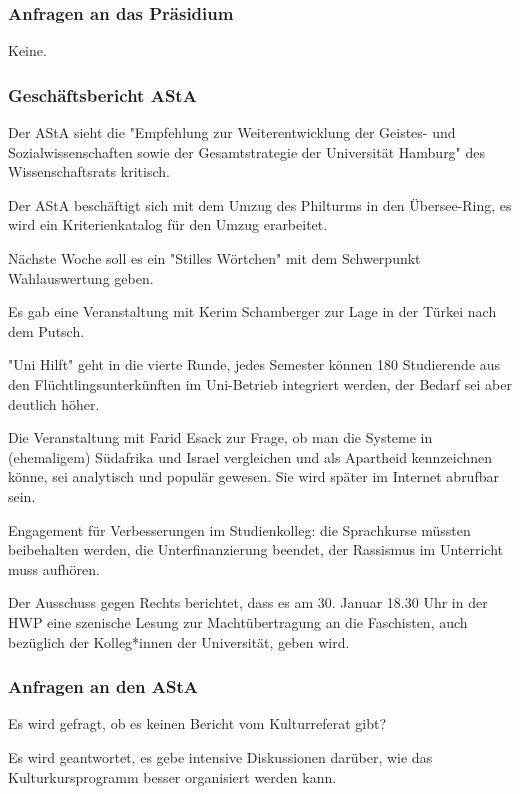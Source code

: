 \documentclass[ngerman,headheight=70pt]{scrartcl}
\begin{document}
    \subsubsection{Anfragen an das Präsidium}

    Keine.

    \subsubsection{Geschäftsbericht AStA}

    Der AStA sieht die "Empfehlung zur Weiterentwicklung der Geistes- und
    Sozialwissenschaften sowie der Gesamtstrategie der Universität Hamburg" des
    Wissenschaftsrats kritisch.

    Der AStA beschäftigt sich mit dem Umzug des Philturms in den Übersee-Ring,
    es wird ein Kriterienkatalog für den Umzug erarbeitet.

    Nächste Woche soll es ein "Stilles Wörtchen" mit dem Schwerpunkt
    Wahlauswertung geben.

    Es gab eine Veranstaltung mit Kerim Schamberger zur Lage in der Türkei nach
    dem Putsch.

    "Uni Hilft" geht in die vierte Runde, jedes Semester können 180 Studierende
    aus den Flüchtlingsunterkünften im Uni-Betrieb integriert werden, der Bedarf
    sei aber deutlich höher.

    Die Veranstaltung mit Farid Esack zur Frage, ob man die Systeme in
    (ehemaligem) Südafrika und Israel vergleichen und als Apartheid kennzeichnen
    könne, sei analytisch und populär gewesen. Sie wird später im Internet
    abrufbar sein.

    Engagement für Verbesserungen im Studienkolleg: die Sprachkurse müssten
    beibehalten werden, die Unterfinanzierung beendet, der Rassismus im
    Unterricht muss aufhören.

    Der Ausschuss gegen Rechts berichtet, dass es am 30. Januar 18.30 Uhr in der
    HWP eine szenische Lesung zur Machtübertragung an die Faschisten, auch
    bezüglich der Kolleg*innen der Universität, geben wird.


    \subsubsection{Anfragen an den AStA}

    Es wird gefragt, ob es keinen Bericht vom Kulturreferat gibt?

    Es wird geantwortet, es gebe intensive Diskussionen darüber, wie das
    Kulturkursprogramm besser organisiert werden kann.
\end{document}
